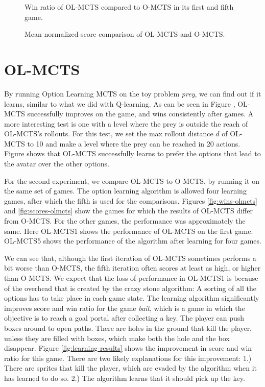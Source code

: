 \begin{figure}
	\centering
	\vspace{-.8cm}
	\caption{Win ratio of OL-MCTS compared to O-MCTS in its first and fifth game.}
	\label{fig:wins}
	\centering
	\vspace{-.8cm}
	\caption{Mean normalized score comparison of OL-MCTS and O-MCTS.}
	\label{fig:scores}
\end{figure}


\section{OL-MCTS}
\label{subsec:olmcts}
By running Option Learning MCTS on the toy problem \textit{prey}, we can find
out if it learns, similar to what we did with Q-learning. As can be seen in
Figure , OL-MCTS successfully improves on the
game, and wins consistently after \todo{} games. A more interesting test is one
with a level where the prey is outside the reach of OL-MCTS's rollouts. For this
test, we set the max rollout distance $d$ of OL-MCTS to 10 and make a level
where the prey can be reached in 20 actions. Figure  shows that
OL-MCTS successfully learns to prefer the options that lead to the avatar over
the other options.




For the second experiment, we compare OL-MCTS to O-MCTS, by running it on the
same set of games. The option learning algorithm is allowed four learning games,
after which the fifth is used for the comparisons. Figures \ref{fig:wins-olmcts}
and \ref{fig:scores-olmcts} show the games for which the results of OL-MCTS
differ from O-MCTS. For the other games, the performance was approximately the
same. Here OL-MCTS1 shows the performance of OL-MCTS on the first game. OL-MCTS5
shows the performance of the algorithm after learning for four games. 

We can see that, although the first iteration of OL-MCTS sometimes performs a
bit worse than O-MCTS, the fifth iteration often scores at least as high, or
higher than O-MCTS. We expect that the loss of performance in OL-MCTS1 is
because of the overhead that is created by the crazy stone algorithm: A sorting
of all the options has to take place in each game state. The learning algorithm
significantly improves score and win ratio for the game \textit{bait}, which is
a game in which the objective is to reach a goal portal after collecting a key.
The player can push boxes around to open paths. There are holes in the ground
that kill the player, unless they are filled with boxes, which make both the
hole and the box disappear. Figure \ref{fig:learning-results} shows the
improvement in score and win ratio for this game. There are two likely 
explanations for this improvement: 1.) There are sprites that kill the player,
which are evaded by the algorithm when it has learned to do so.  2.) The
algorithm learns that it should pick up the key.


